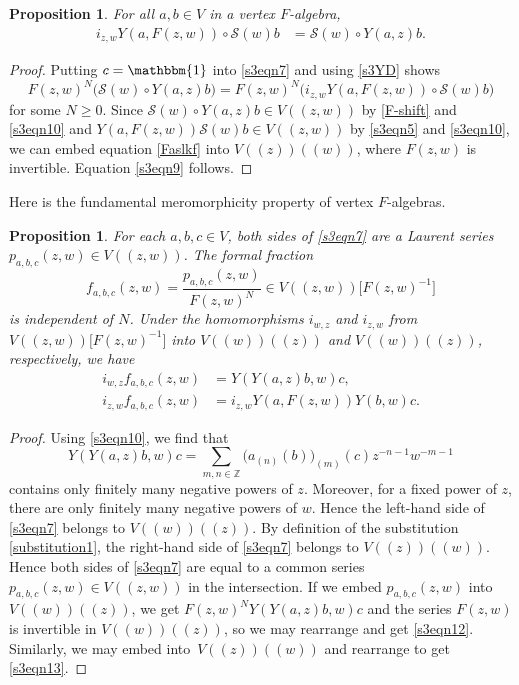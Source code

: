 \documentclass[pdftex]{sigma}
\numberwithin{equation}{section}
\newtheorem{Proposition}[Theorem]{Proposition}
\theoremstyle{definition}
\begin{document}
\begin{Proposition}
For all $a,b \in V$ in a vertex $F$-algebra,
\begin{align}
\label{s3eqn9}
 i_{z,w}Y(a,F(z,w))\circ\mathcal{S}(w)b&=\mathcal{S}(w)\circ Y(a,z)b.
\end{align}
\end{Proposition}

\begin{proof}
 Putting $c=\mathbbm{1}$ into \eqref{s3eqn7} and using \eqref{s3YD} shows
 \begin{equation}
 \label{Faslkf}
 F(z,w)^N \bigl(\mathcal{S}(w)\circ Y(a,z)b \bigr) = F(z,w)^N\bigl(i_{z,w}Y(a,F(z,w))\circ\mathcal{S}(w)b\bigr)
 \end{equation}
 for some $N\geqslant0$. Since $\mathcal{S}(w)\circ Y(a,z)b \in V(\!( z,w)\!)$ by \eqref{F-shift} and \eqref{s3eqn10} and $Y(a,F(z,w))\mathcal{S}(w)b \in V(\!( z,w)\!)$ by \eqref{s3eqn5} and \eqref{s3eqn10}, we can embed equation \eqref{Faslkf} into $V(\!( z)\!)(\!( w)\!)$, where $F(z,w)$ is invertible. Equation \eqref{s3eqn9} follows.
\end{proof}

Here is the fundamental meromorphicity property of vertex $F$-algebras.

\begin{Proposition}
\label{prop:pabc}
For each $a,b,c\in V$, both sides of \eqref{s3eqn7} are a Laurent series $p_{a,b,c}(z,w)\in V(\!( z,w)\!)$. The formal fraction
\begin{equation}
\label{fABC}
 f_{a,b,c}(z,w)=\frac{p_{a,b,c}(z,w)}{F(z,w)^N}\in V(\!( z,w)\!)\big[F(z,w)^{-1}\big]
\end{equation}
is independent of $N$. Under the homomorphisms $i_{w,z}$ and $i_{z,w}$ from $V(\!( z,w)\!)\big[F(z,w)^{-1}\big]$ into $V(\!( w)\!)(\!( z)\!)$ and $V(\!( w)\!)(\!( z)\!)$, respectively, we have
\begin{align}
 i_{w,z} f_{a,b,c}(z,w)&=Y(Y(a,z)b,w)c,\label{s3eqn12}\\
 i_{z,w} f_{a,b,c}(z,w)&=i_{z,w}Y(a,F(z,w))Y(b,w)c.\label{s3eqn13}
\end{align}
\end{Proposition}

\begin{proof}
Using \eqref{s3eqn10}, we find that
\[
 Y(Y(a,z)b,w)c = \sum_{m,n\in\mathbb{Z}} \bigl(a_{(n)}(b)\bigr)_{(m)}(c) z^{-n-1}w^{-m-1}
\]
contains only finitely many negative powers of $z$. Moreover, for a fixed power of $z$, there are only finitely many negative powers of $w$. Hence the left-hand side of \eqref{s3eqn7} belongs to $V(\!( w)\!)(\!( z)\!)$. By definition of the substitution \eqref{substitution1}, the right-hand side of \eqref{s3eqn7} belongs to $V(\!( z)\!)(\!( w)\!)$. Hence both sides of \eqref{s3eqn7} are equal to a common series $p_{a,b,c}(z,w)\in V(\!( z,w)\!)$ in the intersection. If we embed $p_{a,b,c}(z,w)$ into $V(\!( w)\!)(\!( z)\!)$, we get $F(z,w)^N Y(Y(a,z)b,w)c$ and the series $F(z,w)$ is invertible in $V(\!( w)\!)(\!( z)\!)$, so we may rearrange and get \eqref{s3eqn12}. Similarly, we may embed into~${V(\!( z)\!)(\!( w)\!)}$ and rearrange to get \eqref{s3eqn13}.
\end{proof}
\end{document}
